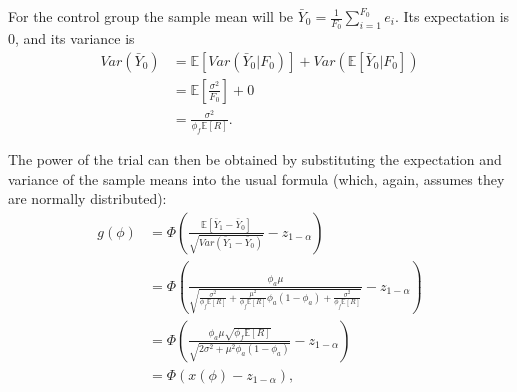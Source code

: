 \documentclass[AMA,STIX1COL]{WileyNJD-v2}
\begin{document}
For the control group the sample mean will be $\bar{Y}_0 = \frac{1}{F_0}\sum_{i=1}^{F_0} e_i$. Its expectation is 0, and its variance is
\begin{align*}
Var(\bar{Y}_0) &= \mathbb{E}[Var(\bar{Y}_0 | F_0)] + Var(\mathbb{E}[\bar{Y}_0 | F_0]) \\
&= \mathbb{E} \left[ \frac{\sigma^2}{F_0} \right] + 0\\
&= \frac{\sigma^2}{\phi_f \mathbb{E}[R]}.
\end{align*}

The power of the trial can then be obtained by substituting the expectation and variance of the sample means into the usual formula (which, again, assumes they are normally distributed):
\begin{align*}
g(\phi) &= \Phi \left(\frac{\mathbb{E}[\bar{Y}_1 - \bar{Y}_0]}{\sqrt{Var(\bar{Y}_1 - \bar{Y}_0)}} - z_{1-\alpha} \right) \\
&= \Phi \left( \frac{\phi_a\mu}{\sqrt{ \frac{\sigma^2}{\phi_f \mathbb{E}[R]} + \frac{\mu^2}{\phi_f \mathbb{E}[R]} \phi_a (1-\phi_a) + \frac{\sigma^2}{\phi_f \mathbb{E}[R]}} } - z_{1-\alpha} \right) \\
&= \Phi \left( \frac{ \phi_a\mu \sqrt{\phi_f \mathbb{E}[R]} } {\sqrt{2\sigma^2 + \mu^2 \phi_a(1-\phi_a)}} - z_{1-\alpha} \right) \\
&= \Phi \left( x(\phi) - z_{1-\alpha} \right),
\end{align*}
\end{document}
